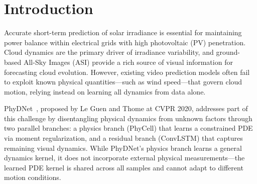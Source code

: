 \documentclass[11pt,a4paper]{article}
\begin{document}
\begin{abstract}
Short-term solar irradiance forecasting is critical for photovoltaic (PV) power grid stability, yet current deep learning approaches struggle to incorporate known physical quantities such as wind speed into their prediction pipeline. In this work, we extend the PhyDNet architecture---a disentangled spatio-temporal model that separates physical dynamics from unknown factors---by injecting velocity information directly into the physics branch via an advection mechanism. The proposed modification uses a learnable spatial shift based on the advection equation, implemented through differentiable grid sampling, and introduces a single learnable velocity scaling parameter. We validate the approach on the Moving MNIST dataset, where ground-truth digit velocities are extracted from the trajectory generator. Experiments over 100 training epochs demonstrate that the velocity-augmented model consistently outperforms the baseline, achieving a 13.9\% reduction in MSE and a 3.1\% improvement in SSIM on the test set. The learned velocity scale converges to 10.23, confirming that the model actively leverages the velocity signal. These results establish a foundation for applying the approach to real-world sky image prediction using the SKIPP'D dataset, where wind speed data will drive cloud advection modeling for PV power forecasting.
\end{abstract}

\section{Introduction}
\label{sec:intro}

Accurate short-term prediction of solar irradiance is essential for maintaining power balance within electrical grids with high photovoltaic (PV) penetration. Cloud dynamics are the primary driver of irradiance variability, and ground-based All-Sky Images (ASI) provide a rich source of visual information for forecasting cloud evolution. However, existing video prediction models often fail to exploit known physical quantities---such as wind speed---that govern cloud motion, relying instead on learning all dynamics from data alone.

PhyDNet~\cite{leguen2020phydnet}, proposed by Le Guen and Thome at CVPR 2020, addresses part of this challenge by disentangling physical dynamics from unknown factors through two parallel branches: a physics branch (PhyCell) that learns a constrained PDE via moment regularization, and a residual branch (ConvLSTM) that captures remaining visual dynamics. While PhyDNet's physics branch learns a general dynamics kernel, it does not incorporate external physical measurements---the learned PDE kernel is shared across all samples and cannot adapt to different motion conditions.
\end{document}
